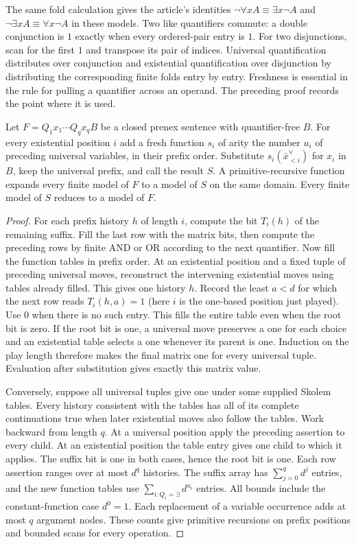 The same fold calculation gives the article's identities $\neg\forall x A\equiv\exists x\neg A$ and $\neg\exists x A\equiv\forall x\neg A$ in these models. Two like quantifiers commute: a double conjunction is $1$ exactly when every ordered-pair entry is $1$. For two disjunctions, scan for the first $1$ and transpose its pair of indices. Universal quantification distributes over conjunction and existential quantification over disjunction by distributing the corresponding finite folds entry by entry. Freshness is essential in the rule for pulling a quantifier across an operand. The preceding proof records the point where it is used.

\begin{theorem}
Let $F=Q_1x_1\cdots Q_qx_q B$ be a closed prenex sentence with quantifier-free $B$. For every existential position $i$ add a fresh function $s_i$ of arity the number $u_i$ of preceding universal variables, in their prefix order. Substitute $s_i(\bar x_{<i}^{\forall})$ for $x_i$ in $B$, keep the universal prefix, and call the result $S$. A primitive-recursive function expands every finite model of $F$ to a model of $S$ on the same domain. Every finite model of $S$ reduces to a model of $F$.
\end{theorem}
\begin{proof}
For each prefix history $h$ of length $i$, compute the bit $T_i(h)$ of the remaining suffix. Fill the last row with the matrix bits, then compute the preceding rows by finite AND or OR according to the next quantifier. Now fill the function tables in prefix order. At an existential position and a fixed tuple of preceding universal moves, reconstruct the intervening existential moves using tables already filled. This gives one history $h$. Record the least $a<d$ for which the next row reads $T_i(h,a)=1$ (here $i$ is the one-based position just played). Use $0$ when there is no such entry. This fills the entire table even when the root bit is zero. If the root bit is one, a universal move preserves a one for each choice and an existential table selects a one whenever its parent is one. Induction on the play length therefore makes the final matrix one for every universal tuple. Evaluation after substitution gives exactly this matrix value.

Conversely, suppose all universal tuples give one under some supplied Skolem tables. Every history consistent with the tables has all of its complete continuations true when later existential moves also follow the tables. Work backward from length $q$. At a universal position apply the preceding assertion to every child. At an existential position the table entry gives one child to which it applies. The suffix bit is one in both cases, hence the root bit is one. Each row assertion ranges over at most $d^q$ histories. The suffix array has $\sum_{j=0}^q d^j$ entries, and the new function tables use $\sum_{i:Q_i=\exists}d^{u_i}$ entries. All bounds include the constant-function case $d^0=1$. Each replacement of a variable occurrence adds at most $q$ argument nodes. These counts give primitive recursions on prefix positions and bounded scans for every operation.
\end{proof}

